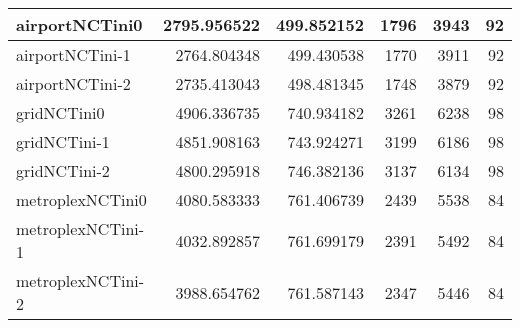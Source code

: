\begin{longtable}{|l|r|r|r|r|r|}
airportNCTini0 & 2795.956522 & 499.852152 & 1796 & 3943 & 92 \\ \hline
airportNCTini-1 & 2764.804348 & 499.430538 & 1770 & 3911 & 92 \\ \hline
airportNCTini-2 & 2735.413043 & 498.481345 & 1748 & 3879 & 92 \\ \hline
gridNCTini0 & 4906.336735 & 740.934182 & 3261 & 6238 & 98 \\ \hline
gridNCTini-1 & 4851.908163 & 743.924271 & 3199 & 6186 & 98 \\ \hline
gridNCTini-2 & 4800.295918 & 746.382136 & 3137 & 6134 & 98 \\ \hline
metroplexNCTini0 & 4080.583333 & 761.406739 & 2439 & 5538 & 84 \\ \hline
metroplexNCTini-1 & 4032.892857 & 761.699179 & 2391 & 5492 & 84 \\ \hline
metroplexNCTini-2 & 3988.654762 & 761.587143 & 2347 & 5446 & 84 \\ \hline
\end{longtable}

